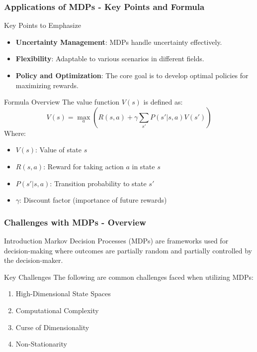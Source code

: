 \documentclass[aspectratio=169]{beamer}
\begin{document}
\begin{frame}[fragile]
    \frametitle{Applications of MDPs - Key Points and Formula}
    \begin{block}{Key Points to Emphasize}
        \begin{itemize}
            \item \textbf{Uncertainty Management}: MDPs handle uncertainty effectively.
            \item \textbf{Flexibility}: Adaptable to various scenarios in different fields.
            \item \textbf{Policy and Optimization}: The core goal is to develop optimal policies for maximizing rewards.
        \end{itemize}
    \end{block}
    \begin{block}{Formula Overview}
        The value function \( V(s) \) is defined as:
        \begin{equation}
            V(s) = \max_a \left( R(s, a) + \gamma \sum_{s'} P(s'|s, a)V(s') \right)
        \end{equation}
        Where:
        \begin{itemize}
            \item \( V(s) \): Value of state \( s \)
            \item \( R(s, a) \): Reward for taking action \( a \) in state \( s \)
            \item \( P(s'|s, a) \): Transition probability to state \( s' \)
            \item \( \gamma \): Discount factor (importance of future rewards)
        \end{itemize}
    \end{block}
\end{frame}

\begin{frame}[fragile]
    \frametitle{Challenges with MDPs - Overview}
    \begin{block}{Introduction}
        Markov Decision Processes (MDPs) are frameworks used for decision-making where outcomes are partially random and partially controlled by the decision-maker. 
    \end{block}
    
    \begin{block}{Key Challenges}
        The following are common challenges faced when utilizing MDPs:
        \begin{enumerate}
            \item High-Dimensional State Spaces
            \item Computational Complexity
            \item Curse of Dimensionality
            \item Non-Stationarity
        \end{enumerate}
    \end{block}
\end{frame}
\end{document}

